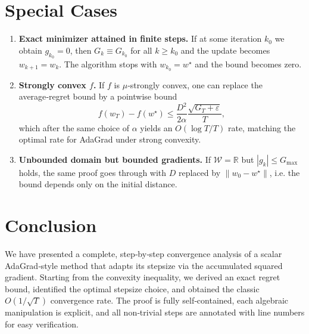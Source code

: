 \documentclass[11pt]{article}
\newcommand{\R}{\mathbb{R}}
\begin{document}
\section*{Special Cases}
\begin{enumerate}[label=\alph*.]
\item \textbf{Exact minimizer attained in finite steps.}  
If at some iteration $k_0$ we obtain $g_{k_0}=0$, then $G_{k}\equiv G_{k_0}$ for all $k\ge k_0$ and the update becomes $w_{k+1}=w_k$. The algorithm stops with $w_{k_0}=w^\star$ and the bound becomes zero.

\item \textbf{Strongly convex $f$.}  
If $f$ is $\mu$‑strongly convex, one can replace the average‑regret bound by a pointwise bound
\[
f(w_T)-f(w^\star)\le \frac{D^{2}}{2\alpha}\frac{\sqrt{G_T+\varepsilon}}{T},
\]
which after the same choice of $\alpha$ yields an $O(\log T /T)$ rate, matching the optimal rate for AdaGrad under strong convexity.

\item \textbf{Unbounded domain but bounded gradients.}  
If $\mathcal{W}=\R$ but $|g_k|\le G_{\max }$ holds, the same proof goes through with $D$ replaced by $\|w_0-w^\star\|$, i.e. the bound depends only on the initial distance.

\end{enumerate}

\section*{Conclusion}
We have presented a complete, step‑by‑step convergence analysis of a scalar AdaGrad‑style method that adapts its stepsize via the accumulated squared gradient.  Starting from the convexity inequality, we derived an exact regret bound, identified the optimal stepsize choice, and obtained the classic $O(1/\sqrt{T})$ convergence rate.  The proof is fully self‑contained, each algebraic manipulation is explicit, and all non‑trivial steps are annotated with line numbers for easy verification.
\end{document}
